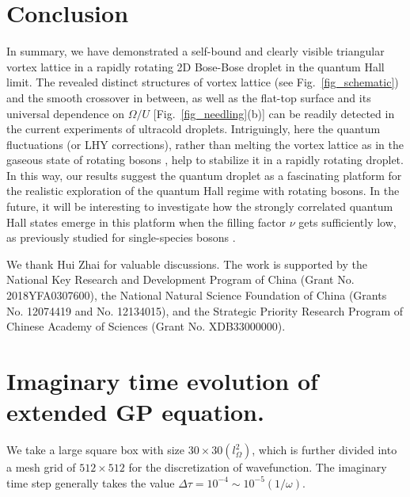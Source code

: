 \documentclass[reprint,aps,pra,twocolumn,superscriptaddress]{revtex4-1}
\begin{document}
\section{Conclusion}
In summary, we have demonstrated a self-bound and clearly visible triangular vortex lattice in a rapidly rotating 2D Bose-Bose droplet in the quantum Hall limit. The revealed distinct structures of vortex lattice (see Fig.~\ref{fig_schematic}) and the smooth crossover in between, as well as the flat-top surface and its universal dependence on  $\Omega/U$ [Fig.~\ref{fig_needling}(b)] can be readily detected in the current experiments of ultracold droplets. 
Intriguingly, here the quantum fluctuations (or LHY corrections), rather than melting the vortex lattice as in the gaseous state of rotating bosons \cite{review2,Sinova2002:QuantumMeltingAbsence}, help to stabilize it in a rapidly rotating droplet. In this way,  
our results suggest  the quantum droplet as a fascinating platform for the realistic exploration of the quantum Hall regime with rotating bosons. In the future, it will be interesting to investigate how the strongly correlated quantum Hall states emerge in this platform when the filling factor $\nu$ gets sufficiently low, as previously studied for single-species bosons \cite{Cooper, Sinova2002:QuantumMeltingAbsence,Regnault2003:QuantumHallFractions}.




\acknowledgments
We thank Hui Zhai for valuable discussions.
The work is supported by the National Key Research and Development Program of China (Grant No. 2018YFA0307600), the National Natural Science Foundation of China (Grants No. 12074419 and No. 12134015), and the Strategic Priority Research Program of Chinese Academy of Sciences (Grant No. XDB33000000).

\appendix

\section{Imaginary time evolution of  extended GP equation.}

We take a large square box with size $30\times30 (l_{\Omega}^{2})$, which  is further divided into a mesh grid of $512\times512$ for the discretization of wavefunction. The imaginary time step generally takes the value $\Delta \tau=10^{-4}\sim10^{-5} (1/\omega)$. 
\end{document}
